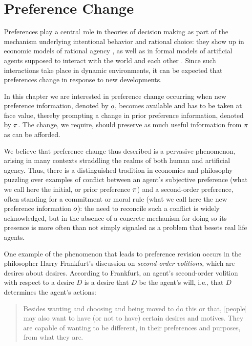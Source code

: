 \chapter{Preference Change}\label{ch:7}

Preferences play a central role in theories of decision making
as part of the mechanism underlying intentional behavior and rational choice:
they show up in economic models of rational 
agency \cite{MasColell95,Sen17},
as well as in formal models of artificial agents 
supposed to interact with the world and each 
other \cite{BoutilierBDHP04,DomshlakHKP11,RossiVW11,PigozziTV16}.
Since such interactions take place in dynamic environments, 
it can be expected that preferences change in response to new developments.

In this chapter we are interested in preference change 
occurring when new preference information,
denoted by $o$, becomes available and has to be taken at face value, 
thereby prompting a change in prior preference information, denoted by $\pi$.
The change, we require, should preserve as much useful information from $\pi$
as can be afforded.

We believe that preference change thus described is a pervasive phenomenon, 
arising in many contexts straddling the realms of both human and artificial agency.
Thus, there is a distinguished tradition in economics and philosophy
puzzling over examples of conflict between an agent's subjective preference
(what we call here the initial, or prior preference $\pi$) 
and a second-order preference,
often standing for a commitment or moral rule 
(what we call here the new preference information $o$):
the need to reconcile such a conflict is widely acknowledged, but in the absence
of a concrete mechanism for doing so its presence is more often than not 
simply signaled as a problem that besets real life agents.

One example of the phenomenon that leads to preference revision
occurs in the philosopher Harry Frankfurt's discussion on  
\emph{second-order volitions}, which are desires about desires.
According to Frankfurt, an agent's second-order volition with respect 
to a desire $D$ is a desire that $D$ be the agent's will, 
i.e., that $D$ determines the agent's actions:
\begin{quote}
	Besides wanting and choosing and being moved to do this or that, 
	[people] may also want to have (or not to have) certain desires and motives. 
	They are capable of wanting to be different, 
	in their preferences and purposes, from what they are.
	\cite{Frankfurt88}
\end{quote}

